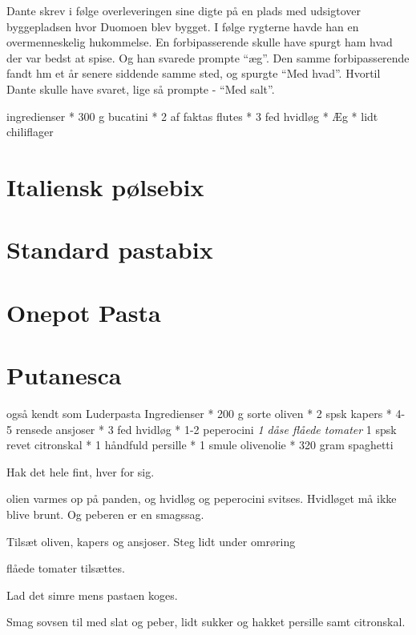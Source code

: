 \documentclass[
]{book}
\begin{document}
Dante skrev i følge overleveringen sine digte på en plads med udsigtover byggepladsen hvor Duomoen blev bygget. I følge rygterne havde han en overmenneskelig hukommelse.
En forbipasserende skulle have spurgt ham hvad der var bedst at spise. Og han svarede prompte ``æg''. Den samme forbipasserende fandt hm et år senere siddende samme sted, og spurgte ``Med hvad''. Hvortil Dante skulle have svaret, lige så prompte - ``Med salt''.

ingredienser
* 300 g bucatini
* 2 af faktas flutes
* 3 fed hvidløg
* Æg
* lidt chiliflager

\hypertarget{italiensk-puxf8lsebix}{%
\section{Italiensk pølsebix}\label{italiensk-puxf8lsebix}}

\hypertarget{standard-pastabix}{%
\section{Standard pastabix}\label{standard-pastabix}}

\hypertarget{onepot-pasta}{%
\section{Onepot Pasta}\label{onepot-pasta}}

\hypertarget{putanesca}{%
\section{Putanesca}\label{putanesca}}

også kendt som Luderpasta
Ingredienser
* 200 g sorte oliven
* 2 spsk kapers
* 4-5 rensede ansjoser
* 3 fed hvidløg
* 1-2 peperocini
\emph{1 dåse flåede tomater
} 1 spsk revet citronskal
* 1 håndfuld persille
* 1 smule olivenolie
* 320 gram spaghetti

Hak det hele fint, hver for sig.

olien varmes op på panden, og hvidløg og peperocini svitses. Hvidløget må ikke blive brunt. Og peberen er en smagssag.

Tilsæt oliven, kapers og ansjoser. Steg lidt under omrøring

flåede tomater tilsættes.

Lad det simre mens pastaen koges.

Smag sovsen til med slat og peber, lidt sukker og hakket persille samt citronskal.
\end{document}
